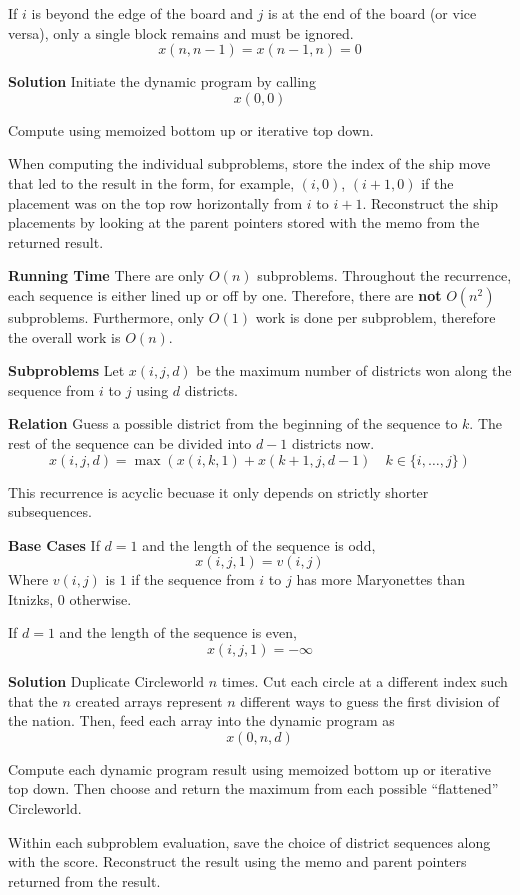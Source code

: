 \documentclass[12pt,twoside]{article}
\begin{document}
\begin{problems}
If $i$ is beyond the edge of the board and $j$ is at the end of the board (or
vice versa), only a single block remains and must be ignored.
$$ x(n, n - 1) = x(n - 1, n) = 0 $$

{\bf Solution} Initiate the dynamic program by calling
$$ x(0, 0) $$

Compute using memoized bottom up or iterative top down.

When computing the individual subproblems, store the index of the ship move
that led to the result in the form, for example, $(i, 0)$, $(i + 1, 0)$ if
the placement was on the top row horizontally from $i$ to $i + 1$.
Reconstruct the ship placements by looking at the parent pointers stored with
the memo from the returned result.

{\bf Running Time} There are only $O(n)$ subproblems. Throughout the
recurrence, each sequence is either lined up or off by one. Therefore, there
are {\bf not} $O(n^2)$ subproblems. Furthermore, only $O(1)$ work is done per
subproblem, therefore the overall work is $O(n)$.

\newpage
\problem  %
{\bf Subproblems} Let $x(i, j, d)$ be the maximum number of districts won
along the sequence from $i$ to $j$ using $d$ districts.

{\bf Relation} Guess a possible district from the beginning of the sequence
to $k$. The rest of the sequence can be divided into $d - 1$ districts now.
$$ x(i, j, d) = \max(x(i, k, 1) + x(k + 1, j, d - 1)\quad k \in \{i, \ldots,
j\}) $$

This recurrence is acyclic becuase it only depends on strictly shorter
subsequences.

{\bf Base Cases} If $d = 1$ and the length of the sequence is odd,
$$ x(i, j, 1) = v(i, j) $$
Where $v(i, j)$ is $1$ if the sequence from $i$ to $j$ has more Maryonettes
than Itnizks, $0$ otherwise.

If $d = 1$ and the length of the sequence is even,
$$ x(i, j, 1) = -\infty $$

{\bf Solution} Duplicate Circleworld $n$ times. Cut each circle at a
different index such that the $n$ created arrays represent $n$ different ways
to guess the first division of the nation. Then, feed each array into the
dynamic program as
$$ x(0, n, d) $$

Compute each dynamic program result using memoized bottom up or iterative top
down. Then choose and return the maximum from each possible ``flattened''
Circleworld.

Within each subproblem evaluation, save the choice of district sequences
along with the score. Reconstruct the result using the memo and parent
pointers returned from the result.


\end{problems}
\end{document}
